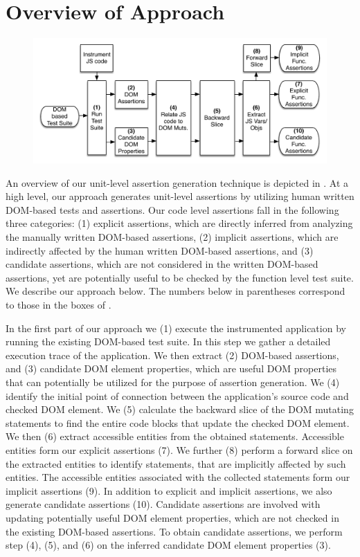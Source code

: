 \section{Overview of Approach} \label{Sec:approach}

\begin{figure}[!t]
  \centering
  \includegraphics[width=.7\hsize]{fig/approachDiagram}
  \vspace{-0.1in} 
  \label{Fig:approachDiagram}
  \vspace{-0.1in} 
\end{figure}
An overview of our unit-level assertion generation technique is depicted in .
At a high level, our approach generates unit-level assertions by utilizing human written DOM-based tests and assertions. Our code level assertions fall in the following three categories: (1) explicit assertions, which are directly inferred from analyzing the manually written DOM-based assertions, (2) implicit assertions, which are indirectly affected by the human written DOM-based assertions, and (3) candidate assertions, which are not considered in the written DOM-based assertions, yet are potentially useful to be checked by the function level test suite. We describe our approach below. The numbers below in parentheses correspond to those in the boxes of .

In the first part of our approach we (1) execute the instrumented application by running the existing DOM-based test suite. In this step we gather a detailed execution trace of the application. We then extract (2) DOM-based assertions, and (3) candidate DOM element properties, which are useful DOM properties that can potentially be utilized for the purpose of assertion generation. We (4) identify the initial point of connection between the application's source code and checked DOM element. 
We (5) calculate the backward slice of the DOM mutating statements to find the entire code blocks that update the checked DOM element. We then (6) extract accessible entities from the obtained statements. Accessible entities form our explicit assertions (7). We further (8) perform a forward slice on the extracted entities to identify statements, that are implicitly affected by such entities. The accessible entities associated with the collected statements form our implicit assertions (9). In addition to explicit and implicit assertions, we also generate candidate assertions (10). Candidate assertions are involved with updating potentially useful DOM element properties, which are not checked in the existing DOM-based assertions. To obtain candidate assertions, we perform step (4), (5), and (6) on the inferred candidate DOM element properties (3).


